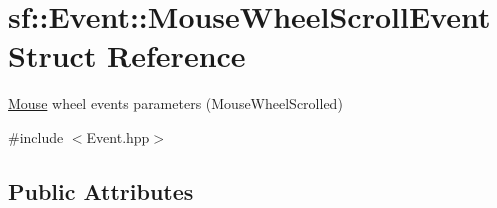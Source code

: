 \hypertarget{structsf_1_1_event_1_1_mouse_wheel_scroll_event}{}\section{sf\+:\+:Event\+:\+:Mouse\+Wheel\+Scroll\+Event Struct Reference}
\label{structsf_1_1_event_1_1_mouse_wheel_scroll_event}


\hyperlink{classsf_1_1_mouse}{Mouse} wheel events parameters (Mouse\+Wheel\+Scrolled)  




{\ttfamily \#include $<$Event.\+hpp$>$}

\subsection*{Public Attributes}
